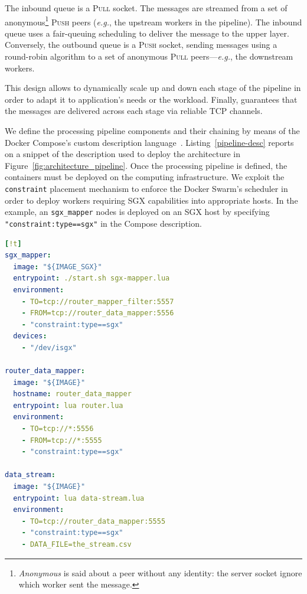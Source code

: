 The inbound queue is a \textsc{Pull} socket.
The messages are streamed from a set of anonymous\footnote{\emph{Anonymous} is said about a peer without any identity: the server socket ignore which worker sent the message.} \textsc{Push} peers (\emph{e.g.}, the upstream workers in the pipeline).
The inbound queue uses a fair-queuing scheduling to deliver the message to the upper layer.
Conversely, the outbound queue is a \textsc{Push} socket, sending messages using a round-robin algorithm to a set of anonymous \textsc{Pull} peers---\emph{e.g.}, the downstream workers.

This design allows to dynamically scale up and down each stage of the pipeline in order to adapt it to application's needs or the workload.
Finally, \zmq{} guarantees that the messages are delivered across each stage via reliable TCP channels.

We define the processing pipeline components and their chaining by means of the Docker Compose's custom description language~\cite{docker:compose}.
Listing~\ref{pipeline-desc} reports on a snippet of the description used to deploy the architecture in Figure~\ref{fig:architecture_pipeline}.
Once the processing pipeline is defined, the containers must be deployed on the computing infrastructure.
We exploit the \texttt{constraint} placement mechanism to enforce the Docker Swarm's scheduler in order to deploy workers requiring SGX capabilities into appropriate hosts.
In the example, an \texttt{sgx\_mapper} nodes is deployed on an SGX host by specifying \texttt{"constraint:type==sgx"} in the Compose description.

\begin{lstlisting}[language=YAML,caption={\SYS pipeline examples. Some attributes (\texttt{volume}, \texttt{networks}, \texttt{env\_file}) omitted.},label=pipeline-desc][!t]
sgx_mapper:
  image: "${IMAGE_SGX}"
  entrypoint: ./start.sh sgx-mapper.lua
  environment:
    - TO=tcp://router_mapper_filter:5557
    - FROM=tcp://router_data_mapper:5556
    - "constraint:type==sgx"
  devices:
    - "/dev/isgx"

router_data_mapper:
  image: "${IMAGE}"
  hostname: router_data_mapper
  entrypoint: lua router.lua
  environment:
    - TO=tcp://*:5556
    - FROM=tcp://*:5555
    - "constraint:type==sgx"

data_stream:
  image: "${IMAGE}"
  entrypoint: lua data-stream.lua
  environment:
    - TO=tcp://router_data_mapper:5555
    - "constraint:type==sgx"
    - DATA_FILE=the_stream.csv
\end{lstlisting}


